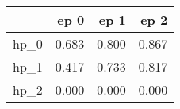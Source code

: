 \begin{tabular}{lrrr}
\toprule
{} &   ep 0 &   ep 1 &   ep 2 \\
\midrule
hp\_0 &  0.683 &  0.800 &  0.867 \\
hp\_1 &  0.417 &  0.733 &  0.817 \\
hp\_2 &  0.000 &  0.000 &  0.000 \\
\bottomrule
\end{tabular}
